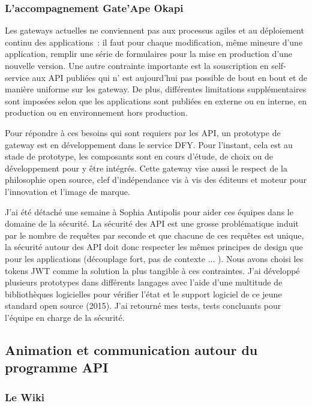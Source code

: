         \subsubsection{L'accompagnement Gate’Ape Okapi}

        Les gateways actuelles ne conviennent pas aux processus agiles et au déploiement continu des applications :  il faut pour chaque modification, même mineure d’une application, remplir une série de formulaires pour la mise en production d’une nouvelle version.
        Une autre contrainte importante est la souscription en self-service aux API publiées qui n’ est aujourd’hui pas possible de bout en bout et de manière uniforme sur les gateway.
        De plus, différentes limitations supplémentaires sont imposées selon que les applications sont publiées en externe ou en interne, en production ou en environnement hors production.

        Pour répondre à ces besoins qui sont requiers par les API, un prototype de gateway est en développement dans le service DFY.
        Pour l’instant, cela est au stade de prototype, les composants sont en cours d’étude, de choix ou de développement pour y être intégrés.
        Cette gateway vise aussi le respect de la philosophie open source, clef d’indépendance vis à vis des éditeurs et moteur pour l’innovation et l’image de marque.

        J’ai été détaché une semaine à Sophia Antipolis pour aider ces équipes dans le domaine de la sécurité.
        La sécurité des API est une grosse problématique induit par le nombre de requêtes par seconde et que chacune de ces requêtes est unique, la sécurité autour des API doit donc respecter les mêmes principes de design que pour les applications (découplage fort, pas de contexte ... ).
        Nous avons choisi les tokens JWT comme la solution la plus tangible à ces contraintes.
        J’ai développé plusieurs prototypes dans différents langages avec l’aide d’une multitude de bibliothèques logicielles pour vérifier l’état et le support logiciel de ce jeune standard open source (2015).
        J’ai retourné mes tests, tests concluants pour l’équipe en charge de la sécurité.

    \subsection{Animation et communication autour du programme API}

        \subsubsection{Le Wiki}


